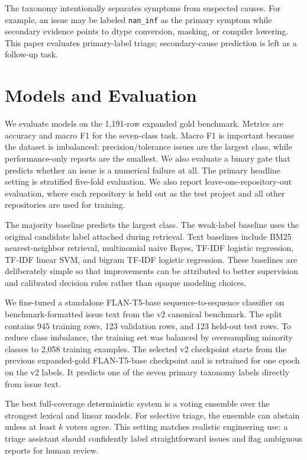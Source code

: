 \documentclass[conference]{IEEEtran}
\begin{document}
The taxonomy intentionally separates symptoms from suspected causes. For
example, an issue may be labeled \texttt{nan\_inf} as the primary symptom while
secondary evidence points to dtype conversion, masking, or compiler lowering.
This paper evaluates primary-label triage; secondary-cause prediction is left
as a follow-up task.

\section{Models and Evaluation}

We evaluate models on the 1,191-row expanded gold benchmark. Metrics are
accuracy and macro F1 for the seven-class task. Macro F1 is important because
the dataset is imbalanced: precision/tolerance issues are the largest class,
while performance-only reports are the smallest. We also evaluate a binary
gate that predicts whether an issue is a numerical failure at all. The primary
headline setting is stratified five-fold evaluation. We also report
leave-one-repository-out evaluation, where each repository is held out as the
test project and all other repositories are used for training.

The majority baseline predicts the largest class. The weak-label baseline uses
the original candidate label attached during retrieval. Text baselines include
BM25 nearest-neighbor retrieval, multinomial naive Bayes, TF-IDF logistic
regression, TF-IDF linear SVM, and bigram TF-IDF logistic regression. These
baselines are deliberately simple so that improvements can be attributed to
better supervision and calibrated decision rules rather than opaque modeling
choices.

We fine-tuned a standalone FLAN-T5-base sequence-to-sequence classifier on
benchmark-formatted issue text from the v2 canonical benchmark. The split
contains 945 training rows, 123 validation rows, and 123 held-out test rows. To
reduce class imbalance, the training set was balanced by oversampling minority
classes to 2,058 training examples. The selected v2 checkpoint starts from the
previous expanded-gold FLAN-T5-base checkpoint and is retrained for one epoch
on the v2 labels. It predicts one of the seven primary taxonomy labels directly
from issue text.

The best full-coverage deterministic system is a voting ensemble over the
strongest lexical and linear models. For selective triage, the ensemble can
abstain unless at least $k$ voters agree. This setting matches realistic
engineering use: a triage assistant should confidently label straightforward
issues and flag ambiguous reports for human review.
\end{document}
